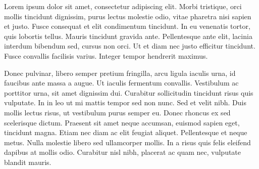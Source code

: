 
\label{Cap:ExperimentosResultados}

Lorem ipsum dolor sit amet, consectetur adipiscing elit. Morbi tristique, orci mollis tincidunt dignissim, purus lectus molestie odio, vitae pharetra nisi sapien et justo. Fusce consequat et elit condimentum tincidunt. In eu venenatis tortor, quis lobortis tellus. Mauris tincidunt gravida ante. Pellentesque ante elit, lacinia interdum bibendum sed, cursus non orci. Ut et diam nec justo efficitur tincidunt. Fusce convallis facilisis varius. Integer tempor hendrerit maximus.

Donec pulvinar, libero semper pretium fringilla, arcu ligula iaculis urna, id faucibus ante massa a augue. Ut iaculis fermentum convallis. Vestibulum ac porttitor urna, sit amet dignissim dui. Curabitur sollicitudin tincidunt risus quis vulputate. In in leo ut mi mattis tempor sed non nunc. Sed et velit nibh. Duis mollis lectus risus, ut vestibulum purus semper eu. Donec rhoncus ex sed scelerisque dictum. Praesent sit amet neque accumsan, euismod sapien eget, tincidunt magna. Etiam nec diam ac elit feugiat aliquet. Pellentesque et neque metus. Nulla molestie libero sed ullamcorper mollis. In a risus quis felis eleifend dapibus at mollis odio. Curabitur nisl nibh, placerat ac quam nec, vulputate blandit mauris.
